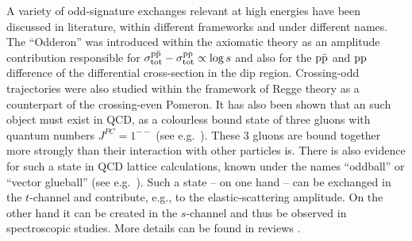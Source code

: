 A variety of odd-signature exchanges relevant at high energies have been discussed in literature, within different frameworks and under different names. The ``Odderon'' was introduced within the axiomatic theory \cite{nicolescu-1992,nicolescu-2007} as an amplitude contribution responsible for $\sigma_{\rm tot}^{\rm p\bar p} - \sigma_{\rm tot}^{\rm pp} \propto \log s$ and also for the $\rm p\bar p$ and $\rm pp$ difference of the differential cross-section in the dip region. Crossing-odd trajectories were also studied within the framework of Regge theory as a counterpart of the crossing-even Pomeron. It has also been shown that an such object must exist in QCD, as a colourless bound state of three gluons with quantum numbers $J^{PC} = 1^{--}$ (see e.g.~\cite{bartels-2000}). These 3 gluons are bound together more strongly than their interaction with other particles is. There is also evidence for such a state in QCD lattice calculations, known under the names ``oddball'' or ``vector glueball'' (see e.g.~\cite{morningstar-1999}). Such a state -- on one hand -- can be exchanged in the $t$-channel and contribute, e.g., to the elastic-scattering amplitude. On the other hand it can be created in the $s$-channel and thus be observed in spectroscopic studies. More details can be found in reviews \cite{braun,ewerz}.

